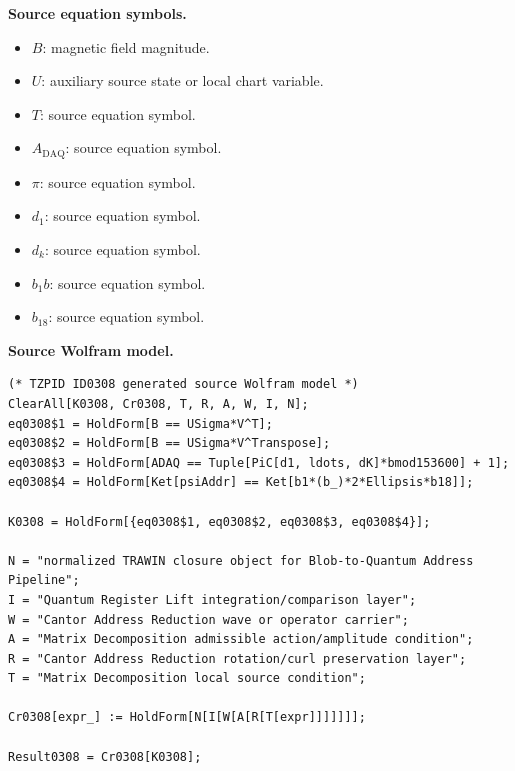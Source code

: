\begin{minipage}[t]{0.49\linewidth}
\begingroup
\small
\raggedright
\textbf{Source equation symbols.}\par
\begin{itemize}[leftmargin=1.35em,itemsep=1pt,topsep=1pt,parsep=0pt]
    \item $B$: magnetic field magnitude.
    \item $U$: auxiliary source state or local chart variable.
    \item $T$: source equation symbol.
    \item $A_{\mathrm{DAQ}}$: source equation symbol.
    \item $\pi$: source equation symbol.
    \item $d_1$: source equation symbol.
    \item $d_k$: source equation symbol.
    \item $b_1b$: source equation symbol.
    \item $b_{18}$: source equation symbol.
\end{itemize}
\endgroup
\end{minipage}\hfill
\begin{minipage}[t]{0.47\linewidth}
\begingroup
\scriptsize
\raggedright
\textbf{Source Wolfram model.}\par
\begin{Verbatim}[fontsize=\tiny,breaklines=true,breakanywhere=true]
(* TZPID ID0308 generated source Wolfram model *)
ClearAll[K0308, Cr0308, T, R, A, W, I, N];
eq0308$1 = HoldForm[B == USigma*V^T];
eq0308$2 = HoldForm[B == USigma*V^Transpose];
eq0308$3 = HoldForm[ADAQ == Tuple[PiC[d1, ldots, dK]*bmod153600] + 1];
eq0308$4 = HoldForm[Ket[psiAddr] == Ket[b1*(b_)*2*Ellipsis*b18]];

K0308 = HoldForm[{eq0308$1, eq0308$2, eq0308$3, eq0308$4}];

N = "normalized TRAWIN closure object for Blob-to-Quantum Address Pipeline";
I = "Quantum Register Lift integration/comparison layer";
W = "Cantor Address Reduction wave or operator carrier";
A = "Matrix Decomposition admissible action/amplitude condition";
R = "Cantor Address Reduction rotation/curl preservation layer";
T = "Matrix Decomposition local source condition";

Cr0308[expr_] := HoldForm[N[I[W[A[R[T[expr]]]]]]];

Result0308 = Cr0308[K0308];
\end{Verbatim}
\endgroup
\end{minipage}

